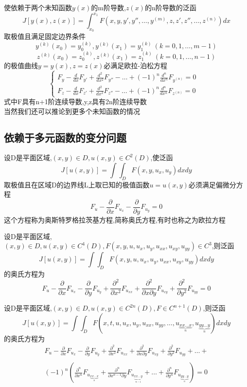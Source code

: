 \documentclass{article}
\begin{document}
\begin{corollary}
使依赖于两个未知函数$y(x)$的m阶导数,$z(x)$的n阶导数的泛函
$$J[y(x),z(x)]=\int_{x_0}^{x_1}F(x,y,y',y'', \ldots , y^{(m)},z,z',z'', \ldots , z^{(n)})dx$$
取极值且满足固定边界条件
$$
y^{(k)}(x_0)=y_0^{(k)}, y^{(k)}(x_1)=y_1^{(k)} ~ (k= 0,1,\ldots , m-1)
$$
$$
z^{(k)}(x_0)=z_0^{(k)}, z^{(k)}(x_1)=z_1^{(k)} ~ (k= 0,1,\ldots , n-1)
$$
的极值曲线$y=y(x),z=z(x)$必满足欧拉-泊松方程
$$
\left\{
  \begin{array}{ll}
    F_y - \frac{d}{dx}F_{y'} + \frac{d^2}{dx^2}F_{y''} - \dots + (-1)^{n}\frac{d^n}{dx^n}F_{y^{(n)}}=0 &\\
    F_z - \frac{d}{dx}F_{z'} + \frac{d^2}{dx^2}F_{z''} - \dots + (-1)^{n}\frac{d^n}{dx^n}F_{z^{(n)}}=0   &
  \end{array}
\right.
$$
式中F具有n+1阶连续导数,y,z具有2n阶连续导数
\\
当然我们还可以推论到更多个未知函数的情况
\end{corollary}

\subsection{依赖于多元函数的变分问题}
\begin{theorem}
设D是平面区域,$(x,y) \in D ,u(x,y) \in C^2(D)$,使泛函
$$
J[u(x,y)]=\int\int_{D}F(x,y,u_x,u_y)dxdy
$$
取极值且在区域D的边界线L上取已知的极值函数$u=u(x,y)$必须满足偏微分方程
$$
F_u -\frac{\partial}{\partial x}F_{u_x}-\frac{\partial}{\partial y}F_{u_y} = 0
$$
这个方程称为奥斯特罗格拉茨基方程,简称奥氏方程,有时也称之为欧拉方程
\end{theorem}

\begin{corollary}
设D是平面区域,$(x,y) \in D ,u(x,y) \in C^4(D),F(x,y,u,u_x,u_y,u_{xx},u_{xy},u_{yy}) \in C^3$,则泛函
$$
J[u(x,y)]=\int\int_{D}F(x,y,u,u_x,u_y,u_{xx},u_{xy},u_{yy})dxdy
$$
的奥氏方程为
$$
F_u -\frac{\partial}{\partial x}F_{u_x}-\frac{\partial}{\partial y}F_{u_y}+ \frac{\partial^2}{\partial x^2}F_{u_{xx}} + \frac{\partial^2}{\partial x \partial y}F_{u_{xy}} + \frac{\partial^2}{\partial y^2}F_{u_{yy}} = 0
$$
\end{corollary}

\begin{corollary}
设D是平面区域,$(x,y) \in D, u(x,y) \in C^{2n}(D),F \in C^{n+1}(D)$,则泛函
$$
J[u(x,y)]=\int\int_{D}F(x,t,u,u_x,u_y,u_{xx},u_{yy}, \ldots , u_{\underbrace{xx \dots x}_{n}},u_{\underbrace{yy \dots y}_{n}})dxdy
$$
的奥氏方程为
$$
\begin{array}{c}
   F_u -\frac{\partial}{\partial x}F_{u_x}-\frac{\partial}{\partial y}F_{u_y}+ \frac{\partial^2}{\partial x^2}F_{u_{xx}} + \frac{\partial^2}{\partial x \partial y}F_{u_{xy}} + \frac{\partial^2}{\partial y^2}F_{u_{yy}} + \dots +  \\
 \\
   (-1)^n (
\frac{\partial^n }{\partial x^n}F_{u_{\underbrace{xx \dots x}_{n}}}+
\frac{\partial^n }{\partial x^{n-1}\partial y}F_{u_{\underbrace{xx \dots y}_{n-1}}}+
\dots+
\frac{\partial^n }{\partial y^n}F_{u_{\underbrace{yy \dots y}_{n}}})
= 0
\end{array}
$$
\end{corollary}
\end{document}
